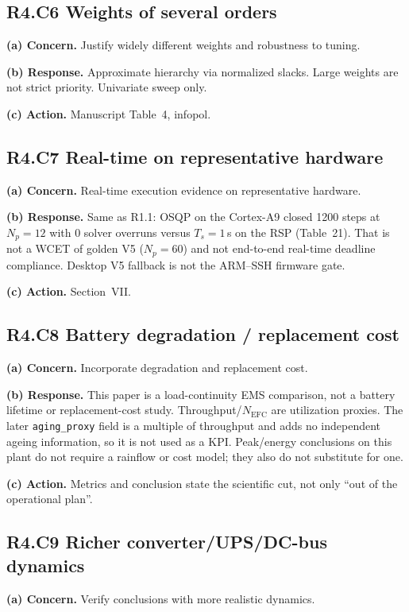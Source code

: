 \documentclass[11pt]{article}
\begin{document}
\subsection*{R4.C6 Weights of several orders}
\textbf{(a) Concern.} Justify widely different weights and robustness to tuning.

\textbf{(b) Response.} Approximate hierarchy via normalized slacks. Large weights are not strict priority. Univariate sweep only.

\textbf{(c) Action.} Manuscript Table~4, infopol.

\subsection*{R4.C7 Real-time on representative hardware}
\textbf{(a) Concern.} Real-time execution evidence on representative hardware.

\textbf{(b) Response.} Same as R1.1: OSQP on the Cortex-A9 closed 1200 steps at $N_p=12$ with 0 solver overruns versus $T_s=1$\,s on the RSP (Table~21). That is not a WCET of golden V5 ($N_p=60$) and not end-to-end real-time deadline compliance. Desktop V5 fallback is not the ARM--SSH firmware gate.

\textbf{(c) Action.} Section~VII.

\subsection*{R4.C8 Battery degradation / replacement cost}
\textbf{(a) Concern.} Incorporate degradation and replacement cost.

\textbf{(b) Response.} This paper is a load-continuity EMS comparison, not a battery lifetime or replacement-cost study. Throughput/$N_{\mathrm{EFC}}$ are utilization proxies. The later \texttt{aging\_proxy} field is a multiple of throughput and adds no independent ageing information, so it is not used as a KPI. Peak/energy conclusions on this plant do not require a rainflow or cost model; they also do not substitute for one.

\textbf{(c) Action.} Metrics and conclusion state the scientific cut, not only ``out of the operational plan''.

\subsection*{R4.C9 Richer converter/UPS/DC-bus dynamics}
\textbf{(a) Concern.} Verify conclusions with more realistic dynamics.
\end{document}
